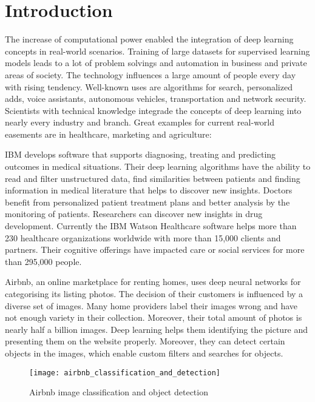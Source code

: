 \chapter{Introduction}

The increase of computational power enabled the integration of deep learning concepts in real-world scenarios.
Training of large datasets for supervised learning models leads to a lot of problem solvings and automation in business and private areas of society.
The technology influences a large amount of people every day with rising tendency.
Well-known uses are algorithms for search, personalized adds, voice assistants, autonomous vehicles, transportation and network security.
\hfill \break
Scientists with technical knowledge integrade the concepts of deep learning into nearly every industry and branch.
Great examples for current real-world easements are in healthcare, marketing and agriculture:

IBM develops software that supports diagnosing, treating and predicting outcomes in medical situations.
Their deep learning algorithms have the ability to read and filter unstructured data, find similarities between patients and finding information in medical literature that helps to discover new insights.
Doctors benefit from personalized patient treatment plans and better analysis by the monitoring of patients. Researchers can discover new insights in drug development.
Currently the IBM Watson Healthcare software helps more than 230 healthcare organizations worldwide with more than 15,000 clients and partners. Their cognitive offerings have impacted care or social services for more than 295,000 people.
\cite{ibm-watson-healthcare, ibm-watson-facts}

Airbnb, an online marketplace for renting homes, uses deep neural networks for categorising its listing photos.
The decision of their customers is influenced by a diverse set of images.
Many home providers label their images wrong and have not enough variety in their collection.
Moreover, their total amount of photos is nearly half a billion images.
Deep learning helps them identifying the picture and presenting them on the website properly.
Moreover, they can detect certain objects in the images, which enable custom filters and searches for objects.
\cite{airbnb-ic-video, airbnb-ic-blog}

\begin{figure}[H]
    \centering
    \texttt{[image: airbnb\_classification\_and\_detection]}
    \caption{\cite{airbnb_image_classification, airbnb_object_detection} Airbnb image classification and object detection}
    \label{fig:airbnb_image_classification}
\end{figure}

